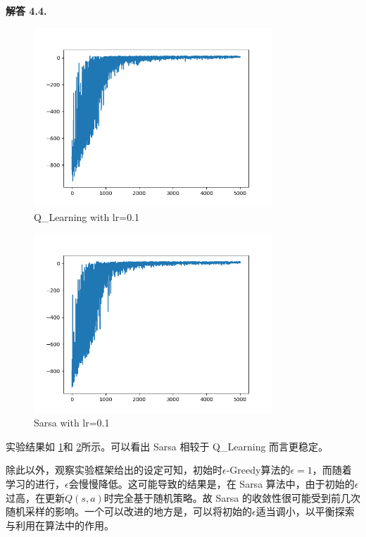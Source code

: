 \documentclass[12pt, a4paper, oneside]{ctexart}
\newenvironment{solution}[1]{\par\noindent\textbf{解答 #1. }\par}{\par}
\begin{document}
\begin{solution}{4.4}
    \begin{figure}
        \centering
        \includegraphics[width=0.8\textwidth]{../code/sarsa_Q_learning/figs/Q_Learning with lr=0.1.png}
        \caption{Q\_Learning with lr=0.1}
        \label{fig:qlearning}
    \end{figure}

    \begin{figure}
        \centering
        \includegraphics[width=0.8\textwidth]{../code/sarsa_Q_learning/figs/Sarsa with lr=0.1.png}
        \caption{Sarsa with lr=0.1}
        \label{fig:sarsa}
    \end{figure}

    实验结果如 \ref{fig:qlearning}和 \ref{fig:sarsa}所示。可以看出 Sarsa 相较于 Q\_Learning 而言更稳定。\par

    除此以外，观察实验框架给出的设定可知，初始时$\epsilon$-Greedy算法的$\epsilon=1$，而随着学习的进行，$\epsilon$会慢慢降低。这可能导致的结果是，在 Sarsa 算法中，由于初始的$\epsilon$过高，在更新$Q(s,a)$时完全基于随机策略。故 Sarsa 的收敛性很可能受到前几次随机采样的影响。一个可以改进的地方是，可以将初始的$\epsilon$适当调小，以平衡探索与利用在算法中的作用。
\end{solution}
\end{document}
